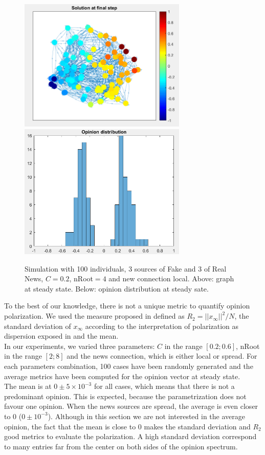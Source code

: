 \begin{figure}[!t]
\centering
\includegraphics[width=8cm]{Figures/Exp20_graph.png}
\includegraphics[width=8cm]{Figures/Exp20_hyst.png}
\caption{Simulation with 100 individuals, 3 sources of Fake and 3 of Real News, $C=0.2$, nRoot$=4$ and new connection local. Above: graph at steady state. Below: opinion distribution at steady sate.}
\label{pics:exp20}
\end{figure}

To the best of our knowledge, there is not a unique metric to quantify opinion polarization. We used the measure proposed in \cite{Matakos2017} defined as $R_2 = ||x_{\infty}||^2/ N$, the standard deviation of $x_{\infty}$ according to the interpretation of polarization as dispersion exposed in \cite{Bramsona2016} and the mean.\\

In our experiments, we varied three parameters: $C$ in the range $[0.2; 0.6]$, nRoot in the range $[2; 8]$ and the news connection, which is either local or spread. For each parameters combination, 100 cases have been randomly generated and the average metrics have been computed for the opinion vector at steady state.\\

The mean is at  $0 \pm 5\times 10^{-3}$ for all cases, which means that there is not a predominant opinion. This is expected, because the parametrization does not favour one opinion. When the news sources are spread, the average is even closer to 0 ($0 \pm 10^{-3}$). Although in this section we are not interested in the average opinion, the fact that the mean is close to 0 makes the standard deviation and $R_2$ good metrics to evaluate the polarization. A high standard deviation correspond to many entries far from the center on both sides of the opinion spectrum.\\

